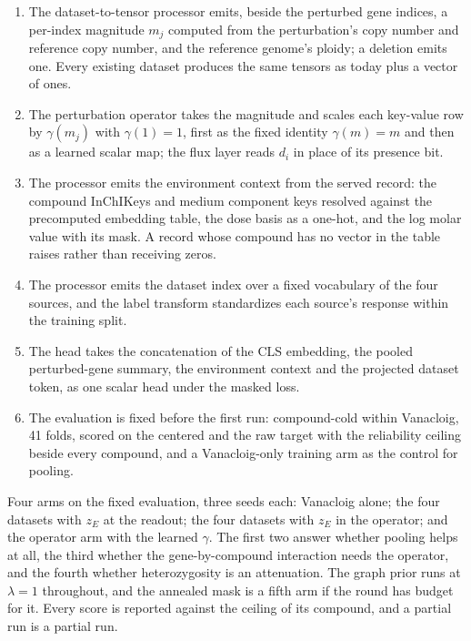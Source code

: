 \begin{enumerate}
\item The dataset-to-tensor processor emits, beside the perturbed gene indices, a per-index
  magnitude $m_j$ computed from the perturbation's copy number and reference copy number, and
  the reference genome's ploidy; a deletion emits one. Every existing dataset produces the
  same tensors as today plus a vector of ones.
\item The perturbation operator takes the magnitude and scales each key-value row by
  $\gamma(m_j)$ with $\gamma(1) = 1$, first as the fixed identity $\gamma(m) = m$ and then as
  a learned scalar map; the flux layer reads $d_i$ in place of its presence bit.
\item The processor emits the environment context from the served record: the compound
  InChIKeys and medium component keys resolved against the precomputed embedding table, the
  dose basis as a one-hot, and the log molar value with its mask. A record whose compound has
  no vector in the table raises rather than receiving zeros.
\item The processor emits the dataset index over a fixed vocabulary of the four sources, and
  the label transform standardizes each source's response within the training split.
\item The head takes the concatenation of the CLS embedding, the pooled perturbed-gene
  summary, the environment context and the projected dataset token, as one scalar head under
  the masked loss.
\item The evaluation is fixed before the first run: compound-cold within Vanacloig, 41 folds,
  scored on the centered and the raw target with the reliability ceiling beside every
  compound, and a Vanacloig-only training arm as the control for pooling.
\end{enumerate}

Four arms on the fixed evaluation, three seeds each: Vanacloig alone; the four datasets with
$z_E$ at the readout; the four datasets with $z_E$ in the operator; and the operator arm with
the learned $\gamma$. The first two answer whether pooling helps at all, the third whether the
gene-by-compound interaction needs the operator, and the fourth whether heterozygosity is an
attenuation. The graph prior runs at $\lambda = 1$ throughout, and the annealed mask is a
fifth arm if the round has budget for it. Every score is reported against the ceiling of its
compound, and a partial run is a partial run.

